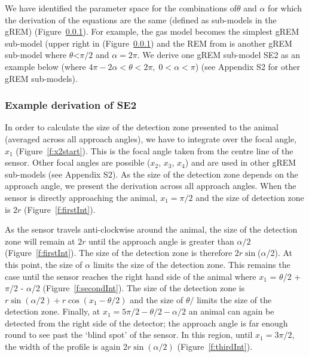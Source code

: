 \documentclass[a4paper,10pt,reqno,oneside]{amsart}
\begin{document}
We have identified the parameter space for the combinations of$\theta$ and $\alpha$ for which the derivation of the equations are the same (defined as sub-models in the gREM) (Figure~\ref{}). For example, the gas model becomes the simplest gREM sub-model (upper right in (Figure~\ref{}) and the REM from \citep{rowcliffe2008estimating} is another gREM sub-model where $\theta$<$\pi/2$ and $\alpha = 2\pi$. We derive one gREM sub-model SE2 as an example below (where $4 \pi - 2 \alpha < \theta < 2\pi ,\; 0 < \alpha <\pi$) (see Appendix S2 for other gREM sub-models).

\subsubsection{Example derivation of SE2}

In order to calculate the size of the detection zone presented to the animal (averaged across all approach angles), we have to integrate over the focal angle, $x_1$ (Figure~\ref{f:x2start}). This is the focal angle taken from the centre line of the sensor. Other focal angles are possible ($x_2$, $x_3$, $x_4$) and are used in other gREM sub-models (see Appendix S2). As the size of the detection zone depends on the approach angle, we present the derivation across all approach angles. When the sensor is directly approaching the animal, $x_1  = \pi/2$ and the size of detection zone is $2r$ (Figure~\ref{f:firstInt}). 

As the sensor travels anti-clockwise around the animal, the size of the detection zone will remain at $2r$ until the approach angle is greater than $\alpha/2$ (Figure~\ref{f:firstInt}). The size of the detection zone is therefore $2r\sin$($\alpha$/2). At this point, the size of $\alpha$ limits the size of the detection zone. This remains the case until the sensor reaches the right hand side of the animal where $x_1$  = $\theta$/2 + $\pi$/2 - $\alpha$/2 (Figure~\ref{f:secondInt}). The size of the detection zone is $r\sin( \alpha/2) + r\cos( x_1  - \theta/2)$ and the size of $\theta/$ limits the size of the detection zone. Finally, at $x_1  = 5\pi/2 - \theta/2  - \alpha/2$ an animal can again be detected from the right side of the detector; the approach angle is far enough round to see past the `blind spot' of the sensor. In this region, until $x_1  = 3\pi/2$, the width of the profile is again $2r\sin(\alpha/2)$ (Figure~\ref{f:thirdInt}). 

\end{document}
